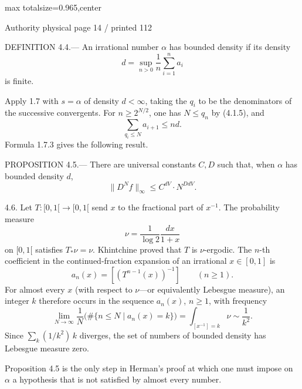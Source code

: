 \documentclass{article}
\begin{document}
\newpage
\noindent\begin{adjustbox}{max totalsize={\textwidth}{0.965\textheight},center}\begin{minipage}{\textwidth}
\noindent\hfill\scriptsize Authority physical page 14 / printed 112\par\normalsize
DEFINITION 4.4.— An irrational number \(\alpha\) has bounded density if its density
\[
d=\sup_{n>0}\frac1n\sum_{i=1}^{n}a_i
\]
is finite.

Apply 1.7 with \(s=\alpha\) of density \(d<\infty\), taking the \(q_i\) to be the denominators of the successive convergents. For \(n\geq2^{N/2}\), one has \(N\leq q_n\) by (4.1.5), and
\[
\sum_{q_i\leq N}a_{i+1}\leq nd.
\]
Formula 1.7.3 gives the following result.

PROPOSITION 4.5.— There are universal constants \(C,D\) such that, when \(\alpha\) has bounded density \(d\),
\[
\|D^Nf\|_\infty\leq C^{dV}\cdot N^{DdV}.
\]

4.6. Let \(T:[0,1[\to[0,1[\) send \(x\) to the fractional part of \(x^{-1}\). The probability measure
\[
\nu=\frac1{\log2}\frac{dx}{1+x}
\]
on \([0,1[\) satisfies \(T_*\nu=\nu\). Khintchine proved that \(T\) is \(\nu\)-ergodic. The \(n\)-th coefficient in the continued-fraction expansion of an irrational \(x\in[0,1]\) is
\[
a_n(x)=[(T^{n-1}(x))^{-1}]\qquad(n\geq1).
\]
For almost every \(x\) (with respect to \(\nu\)—or equivalently Lebesgue measure), an integer \(k\) therefore occurs in the sequence \(a_n(x)\), \(n\geq1\), with frequency
\[
\lim_{N\to\infty}\frac1N\bigl(\#\{n\leq N\mid a_n(x)=k\}\bigr)
=\int_{[x^{-1}]=k}\nu\sim\frac1{k^2}.
\]
Since \(\sum_k(1/k^2)\,k\) diverges, the set of numbers of bounded density has Lebesgue measure zero.

Proposition 4.5 is the only step in Herman’s proof at which one must impose on \(\alpha\) a hypothesis that is not satisfied by almost every number.
\end{minipage}\end{adjustbox}
\end{document}
